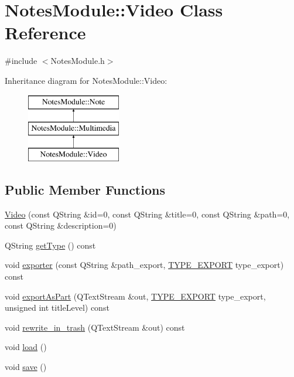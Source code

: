 \hypertarget{class_notes_module_1_1_video}{\section{Notes\-Module\-:\-:Video Class Reference}
\label{class_notes_module_1_1_video}
}


{\ttfamily \#include $<$Notes\-Module.\-h$>$}

Inheritance diagram for Notes\-Module\-:\-:Video\-:\begin{figure}[H]
\begin{center}
\leavevmode
\includegraphics[height=3.000000cm]{class_notes_module_1_1_video}
\end{center}
\end{figure}
\subsection*{Public Member Functions}
\begin{DoxyCompactItemize}
\item 
\hyperlink{class_notes_module_1_1_video_a2ccbdd60912806bfa652192181af7840}{Video} (const Q\-String \&id=0, const Q\-String \&title=0, const Q\-String \&path=0, const Q\-String \&description=0)
\item 
Q\-String \hyperlink{class_notes_module_1_1_video_ab0f28a2be64a8834d8d7ea34227f379c}{get\-Type} () const 
\item 
void \hyperlink{class_notes_module_1_1_video_afdb8f7924a348fb1d7002038310e9804}{exporter} (const Q\-String \&path\-\_\-export, \hyperlink{_t_y_p_e_s___e_x_p_o_r_t_8h_a25a17d8584d83ab977791df2476e006c}{T\-Y\-P\-E\-\_\-\-E\-X\-P\-O\-R\-T} type\-\_\-export) const 
\item 
void \hyperlink{class_notes_module_1_1_video_a6bdae63cd7b612f4be54bb04e849249f}{export\-As\-Part} (Q\-Text\-Stream \&out, \hyperlink{_t_y_p_e_s___e_x_p_o_r_t_8h_a25a17d8584d83ab977791df2476e006c}{T\-Y\-P\-E\-\_\-\-E\-X\-P\-O\-R\-T} type\-\_\-export, unsigned int title\-Level) const 
\item 
void \hyperlink{class_notes_module_1_1_video_a89aecb4a316f47f9228fb59b5e21f887}{rewrite\-\_\-in\-\_\-trash} (Q\-Text\-Stream \&out) const 
\item 
void \hyperlink{class_notes_module_1_1_video_aa319bd3b10ff52792b504f501d92a002}{load} ()
\item 
void \hyperlink{class_notes_module_1_1_video_a7c6a56fd69e2f5b9eec107ff9005bfb5}{save} ()
\end{DoxyCompactItemize}
